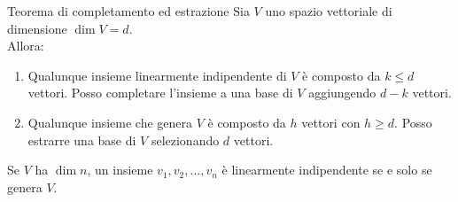 \documentclass[a4paper]{article}
\theoremstyle{definition}
\begin{document}
\begin{teo}{Teorema di completamento ed estrazione}{}
	Sia $V$ uno spazio vettoriale di dimensione $\dim V = d$. \\
	Allora:
	\begin{enumerate}
		\item Qualunque insieme linearmente indipendente di $V$ è composto da $k \leq d$ vettori.
		    Posso completare l'insieme a una base di $V$ aggiungendo $d - k$ vettori.
		\item Qualunque insieme che genera $V$ è composto da $h$ vettori con $h \geq d$.
		    Posso estrarre una base di $V$ selezionando $d$ vettori.
	\end{enumerate}
\end{teo}

\begin{cor}{}{}
	Se $V$ ha $\dim n$, un insieme $v_1, v_2, ..., v_n$ è linearmente indipendente se e solo se genera $V$.
\end{cor}
\end{document}
